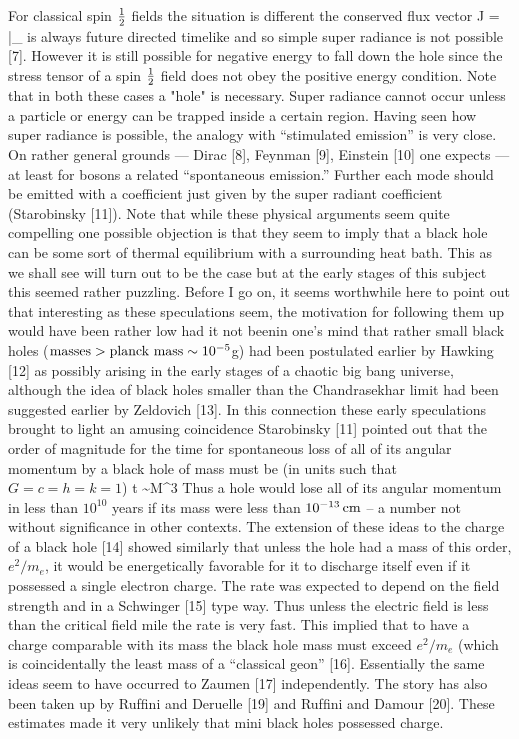 For classical spin $\small{\frac{1}{2}}$
fields the situation is different the conserved flux vector
\be
J = \bar\psi \GG_\mu \psi
\ee
is always future directed timelike and so simple super radiance is not possible [7].
However it is still possible for negative energy to fall down the hole since the stress
tensor of a spin $\small{\frac{1}{2}}$ ﬁeld does not obey the positive energy condition. Note that in both
these cases a "hole" is necessary. Super radiance cannot occur unless a particle or energy
can be trapped inside a certain region. Having seen how super radiance is possible, the analogy
with ``stimulated emission'' is very close. On rather general grounds --- Dirac [8], Feynman [9],
Einstein [10] one expects --- at least for bosons a related ``spontaneous emission.''
Further each mode should be emitted with a coefficient just given by the super radiant
coefficient (Starobinsky [11]). Note that while these physical arguments seem quite
compelling one possible objection is that they seem to imply that a black hole can be some sort
of thermal equilibrium with a surrounding heat bath. This as we shall see will
turn out to be the case but at the early stages of this subject this seemed rather
puzzling. Before I go on, it seems worthwhile here to point out that interesting as these
speculations seem, the motivation for following them up would have been
rather low had it not beenin one's mind that rather small black holes
(${\rm masses} > {\hbox{\rm planck mass}} \sim 10^{-5}$g)
had been postulated earlier by Hawking [12] as possibly arising in the early stages of
a chaotic big bang universe, although the idea of black holes smaller than the Chandrasekhar
limit had been suggested earlier by Zeldovich [13]. In this connection these early
speculations brought to light an amusing coincidence Starobinsky [11] pointed out
that the order of magnitude for the time for spontaneous loss of all of its angular
momentum by a black hole of mass must be (in units such that $G = c = h = k = 1$)
\be
t \sim M^3
\ee
Thus a hole would lose all of its angular momentum in less than $10^{10}$
years if its mass were less than $10^{-13}\,{\rm cm}$ -- a number not without
significance in other contexts. The extension of these ideas to the charge
of a black hole [14] showed similarly that unless the hole had a mass
of this order, $e^2/m_e$, it would be energetically favorable for it to discharge
itself even if it possessed a single electron charge. The rate was expected
to depend on the ﬁeld strength and in a Schwinger [15] type way. Thus unless the
electric field is less than the critical ﬁeld mile the rate is very fast.
This implied that to have a charge comparable with its mass the black hole mass
must exceed $e^2/m_e$ (which is coincidentally the least mass of a ``classical geon'' [16].
Essentially the same ideas seem to have occurred to Zaumen [17] independently.
The story has also been taken up by Rufﬁni and Deruelle [19] and Rufﬁni and Damour [20].
These estimates made it very unlikely that mini black holes possessed charge.

